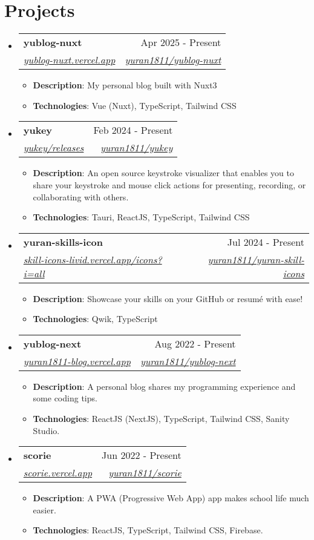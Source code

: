 \documentclass[letterpaper,11pt]{article}
\makeatletter
\newcommand{\resumeItem}[2]{
  \item\small{
    \textbf{#1}{: #2 \vspace{-2pt}}
  }
}
\newcommand{\resumeSubheading}[4]{
  \vspace{-1pt}\item
    \begin{tabular*}{0.97\textwidth}[t]{l@{\extracolsep{\fill}}r}
      \textbf{#1} & #2 \\
      \textit{\small#3} & \textit{\small #4} \\
    \end{tabular*}\vspace{-5pt}
}
\newcommand{\resumeSubHeadingListStart}{\begin{itemize}[leftmargin=*]}
\newcommand{\resumeSubHeadingListEnd}{\end{itemize}}
\newcommand{\resumeItemListStart}{\begin{itemize}}
\newcommand{\resumeItemListEnd}{\end{itemize}\vspace{-5pt}}
\makeatother
\begin{document}
\section{Projects}
\resumeSubHeadingListStart

\resumeSubheading
{yublog-nuxt}{Apr 2025 - Present}
{\href{https://yublog-nuxt.vercel.app/}{yublog-nuxt.vercel.app}}
{\href{https://github.com/yuran1811/yublog-nuxt}{yuran1811/yublog-nuxt}}
\resumeItemListStart
\resumeItem{Description}
{My personal blog built with Nuxt3}
\resumeItem{Technologies}
{Vue (Nuxt), TypeScript, Tailwind CSS}
\resumeItemListEnd

\resumeSubheading
{yukey}{Feb 2024 - Present}
{\href{https://github.com/yuran1811/yukey/releases}{yukey/releases}}
{\href{https://github.com/yuran1811/yukey}{yuran1811/yukey}}
\resumeItemListStart
\resumeItem{Description}
{An open source keystroke visualizer that enables you to share your keystroke and mouse click actions for presenting, recording, or collaborating with others.}
\resumeItem{Technologies}
{Tauri, ReactJS, TypeScript, Tailwind CSS}
\resumeItemListEnd

\resumeSubheading
{yuran-skills-icon}{Jul 2024 - Present}
{\href{https://skill-icons-livid.vercel.app/icons?i=all}{skill-icons-livid.vercel.app/icons?i=all}}
{\href{https://github.com/yuran1811/yuran-skill-icons}{yuran1811/yuran-skill-icons}}
\resumeItemListStart
\resumeItem{Description}
{Showcase your skills on your GitHub or resumé with ease!}
\resumeItem{Technologies}
{Qwik, TypeScript}
\resumeItemListEnd

\resumeSubheading
{yublog-next}{Aug 2022 - Present}
{\href{https://yuran1811-blog.vercel.app/}{yuran1811-blog.vercel.app}}
{\href{https://github.com/yuran1811/yublog-next}{yuran1811/yublog-next}}
\resumeItemListStart
\resumeItem{Description}
{A personal blog shares my programming experience and some coding tips.}
\resumeItem{Technologies}
{ReactJS (NextJS), TypeScript, Tailwind CSS, Sanity Studio.}
\resumeItemListEnd

\resumeSubheading
{scorie}{Jun 2022 - Present}
{\href{https://scorie.vercel.app/}{scorie.vercel.app}}
{\href{https://github.com/yuran1811/scorie}{yuran1811/scorie}}
\resumeItemListStart
\resumeItem{Description}
{A PWA (Progressive Web App) app makes school life much easier.}
\resumeItem{Technologies}
{ReactJS, TypeScript, Tailwind CSS, Firebase.}
\resumeItemListEnd

\resumeSubHeadingListEnd

\end{document}
